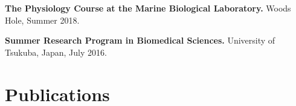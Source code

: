 \documentclass[letterpaper,10pt]{article} %
\begin{document}
%
%


%
%

%

\textbf{The Physiology Course at the Marine Biological Laboratory.} Woods Hole, Summer 2018.

\textbf{Summer Research Program in Biomedical Sciences.} University of Tsukuba, Japan, July 2016.


\section{Publications}
\bigskip
\end{document}
